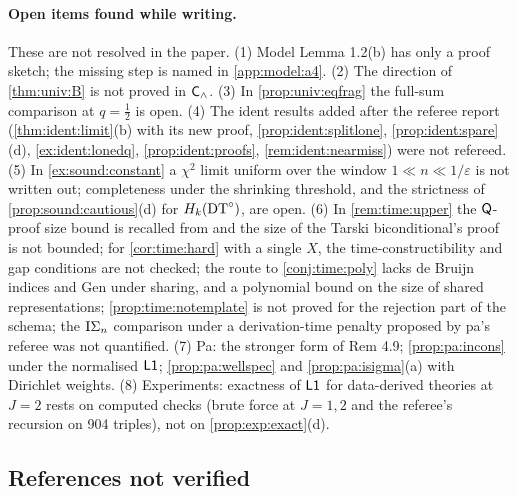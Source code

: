 \paragraph{Open items found while writing.}\label{app:ver:open}
These are not resolved in the paper. (1) Model Lemma 1.2(b) has only a proof sketch; the missing step is named in \cref{app:model:a4}. (2) The direction of \cref{thm:univ:B} is not proved in $\mathsf{C}_{\wedge}$. (3) In \cref{prop:univ:eqfrag} the full-sum comparison at $q=\frac12$ is open. (4) The ident results added after the referee report (\cref{thm:ident:limit}(b) with its new proof, \cref{prop:ident:splitlone}, \cref{prop:ident:spare}(d), \cref{ex:ident:lonedq}, \cref{prop:ident:proofs}, \cref{rem:ident:nearmiss}) were not refereed. (5) In \cref{ex:sound:constant} a $\chi^2$ limit uniform over the window $1\ll n\ll1/\varepsilon$ is not written out; completeness under the shrinking threshold, and the strictness of \cref{prop:sound:cautious}(d) for $H_{k}(\mathrm{DT}^{\circ})$, are open. (6) In \cref{rem:time:upper} the $\mathsf{Q}$-proof size bound is recalled from \citet{pudlak1998lengths} and the size of the Tarski biconditional's proof is not bounded; for \cref{cor:time:hard} with a single $X$, the time-constructibility and gap conditions are not checked; the route to \cref{conj:time:poly} lacks de Bruijn indices and Gen under sharing, and a polynomial bound on the size of shared representations; \cref{prop:time:notemplate} is not proved for the rejection part of the schema; the $\mathrm{I}\Sigma_{n}$ comparison under a derivation-time penalty proposed by pa's referee was not quantified. (7) Pa: the stronger form of Rem 4.9; \cref{prop:pa:incons} under the normalised $\mathord{\mathsf{L1}}$; \cref{prop:pa:wellspec} and \cref{prop:pa:isigma}(a) with Dirichlet weights. (8) Experiments: exactness of $\mathord{\mathsf{L1}}$ for data-derived theories at $J=2$ rests on computed checks (brute force at $J=1,2$ and the referee's recursion on 904 triples), not on \cref{prop:exp:exact}(d).

\subsection{References not verified}\label{app:ver:refs}

